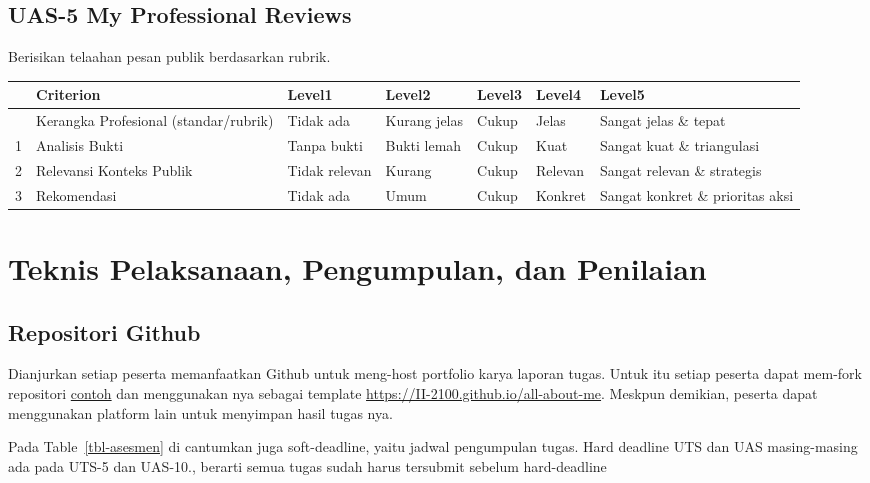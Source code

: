 \documentclass[
  letterpaper,
  DIV=11,
  numbers=noendperiod]{scrreprt}
\begin{document}
\subsection*{UAS-5 My Professional
Reviews}\label{uas-5-my-professional-reviews}

Berisikan telaahan pesan publik berdasarkan rubrik.

\begin{longtable}[]{@{}lllllll@{}}
\toprule\noalign{}
& Criterion & Level1 & Level2 & Level3 & Level4 & Level5 \\
\midrule\noalign{}
\endhead
\bottomrule\noalign{}
\endlastfoot
0 & Kerangka Profesional (standar/rubrik) & Tidak ada & Kurang jelas &
Cukup & Jelas & Sangat jelas \& tepat \\
1 & Analisis Bukti & Tanpa bukti & Bukti lemah & Cukup & Kuat & Sangat
kuat \& triangulasi \\
2 & Relevansi Konteks Publik & Tidak relevan & Kurang & Cukup & Relevan
& Sangat relevan \& strategis \\
3 & Rekomendasi & Tidak ada & Umum & Cukup & Konkret & Sangat konkret \&
prioritas aksi \\
\end{longtable}

\section*{Teknis Pelaksanaan, Pengumpulan, dan
Penilaian}\label{teknis-pelaksanaan-pengumpulan-dan-penilaian}


\subsection*{Repositori Github}\label{repositori-github}

Dianjurkan setiap peserta memanfaatkan Github untuk meng-host portfolio
karya laporan tugas. Untuk itu setiap peserta dapat mem-fork repositori
\href{https://github.com/II-2100/all-about-me}{contoh} dan menggunakan
nya sebagai template \url{https://II-2100.github.io/all-about-me}.
Meskpun demikian, peserta dapat menggunakan platform lain untuk
menyimpan hasil tugas nya.

Pada Table~\ref{tbl-asesmen} di cantumkan juga soft-deadline, yaitu
jadwal pengumpulan tugas. Hard deadline UTS dan UAS masing-masing ada
pada UTS-5 dan UAS-10., berarti semua tugas sudah harus tersubmit
sebelum hard-deadline
\end{document}
